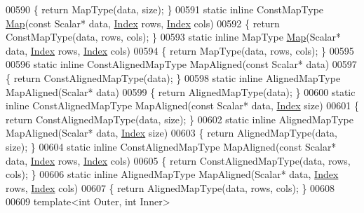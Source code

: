 \begin{DoxyCode}
00590     \{ \textcolor{keywordflow}{return} MapType(data, size); \}
00591     \textcolor{keyword}{static} \textcolor{keyword}{inline} ConstMapType \hyperlink{group___core___module_class_eigen_1_1_map}{Map}(\textcolor{keyword}{const} Scalar* data, \hyperlink{namespace_eigen_a62e77e0933482dafde8fe197d9a2cfde}{Index} rows, \hyperlink{namespace_eigen_a62e77e0933482dafde8fe197d9a2cfde}{Index} cols)
00592     \{ \textcolor{keywordflow}{return} ConstMapType(data, rows, cols); \}
00593     \textcolor{keyword}{static} \textcolor{keyword}{inline} MapType \hyperlink{group___core___module_class_eigen_1_1_map}{Map}(Scalar* data, \hyperlink{namespace_eigen_a62e77e0933482dafde8fe197d9a2cfde}{Index} rows, \hyperlink{namespace_eigen_a62e77e0933482dafde8fe197d9a2cfde}{Index} cols)
00594     \{ \textcolor{keywordflow}{return} MapType(data, rows, cols); \}
00595 
00596     \textcolor{keyword}{static} \textcolor{keyword}{inline} ConstAlignedMapType MapAligned(\textcolor{keyword}{const} Scalar* data)
00597     \{ \textcolor{keywordflow}{return} ConstAlignedMapType(data); \}
00598     \textcolor{keyword}{static} \textcolor{keyword}{inline} AlignedMapType MapAligned(Scalar* data)
00599     \{ \textcolor{keywordflow}{return} AlignedMapType(data); \}
00600     \textcolor{keyword}{static} \textcolor{keyword}{inline} ConstAlignedMapType MapAligned(\textcolor{keyword}{const} Scalar* data, \hyperlink{namespace_eigen_a62e77e0933482dafde8fe197d9a2cfde}{Index} size)
00601     \{ \textcolor{keywordflow}{return} ConstAlignedMapType(data, size); \}
00602     \textcolor{keyword}{static} \textcolor{keyword}{inline} AlignedMapType MapAligned(Scalar* data, \hyperlink{namespace_eigen_a62e77e0933482dafde8fe197d9a2cfde}{Index} size)
00603     \{ \textcolor{keywordflow}{return} AlignedMapType(data, size); \}
00604     \textcolor{keyword}{static} \textcolor{keyword}{inline} ConstAlignedMapType MapAligned(\textcolor{keyword}{const} Scalar* data, \hyperlink{namespace_eigen_a62e77e0933482dafde8fe197d9a2cfde}{Index} rows, 
      \hyperlink{namespace_eigen_a62e77e0933482dafde8fe197d9a2cfde}{Index} cols)
00605     \{ \textcolor{keywordflow}{return} ConstAlignedMapType(data, rows, cols); \}
00606     \textcolor{keyword}{static} \textcolor{keyword}{inline} AlignedMapType MapAligned(Scalar* data, \hyperlink{namespace_eigen_a62e77e0933482dafde8fe197d9a2cfde}{Index} rows, \hyperlink{namespace_eigen_a62e77e0933482dafde8fe197d9a2cfde}{Index} cols)
00607     \{ \textcolor{keywordflow}{return} AlignedMapType(data, rows, cols); \}
00608 
00609     \textcolor{keyword}{template}<\textcolor{keywordtype}{int} Outer, \textcolor{keywordtype}{int} Inner>

\end{DoxyCode}
